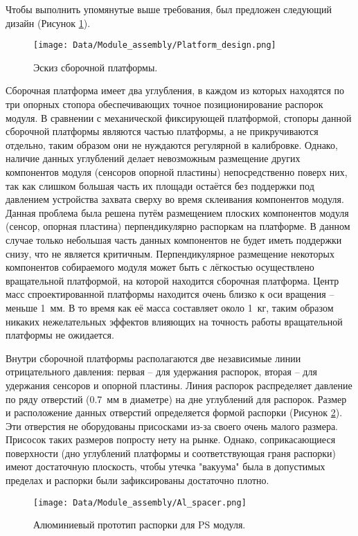 Чтобы выполнить упомянутые выше требования, был предложен следующий дизайн (Рисунок \ref{fig:platform_design}).

\begin{figure}[ht]\centering
\texttt{[image: Data/Module\_assembly/Platform\_design.png]}
\caption{Эскиз сборочной платформы.}
\label{fig:platform_design}
\end{figure}

Сборочная платформа имеет два углубления, в каждом из которых находятся по три опорных стопора обеспечивающих точное позиционирование распорок модуля. В сравнении с механической фиксирующей платформой, стопоры данной сборочной платформы являются частью платформы, а не прикручиваются отдельно, таким образом они не нуждаются регулярной в калибровке. Однако, наличие данных углублений делает невозможным размещение других компонентов модуля (сенсоров опорной пластины) непосредственно поверх них, так как слишком большая часть их площади остаётся без поддержки под давлением устройства захвата сверху во время склеивания компонентов модуля. Данная проблема была решена путём размещением плоских компонентов модуля (сенсор, опорная пластина) перпендикулярно распоркам на платформе. В данном случае только небольшая часть данных компонентов не будет иметь поддержки снизу, что не является критичным. Перпендикулярное размещение некоторых компонентов собираемого модуля может быть с лёгкостью осуществлено вращательной платформой, на которой находится сборочная платформа. Центр масс спроектированной платформы находится очень близко к оси вращения -- меньше 1~мм. В то время как её масса составляет около 1~кг, таким образом никаких нежелательных эффектов влияющих на точность работы вращательной платформы не ожидается.

Внутри сборочной платформы располагаются две независимые линии отрицательного давления: первая -- для удержания распорок, вторая -- для удержания сенсоров и опорной пластины. Линия распорок распределяет давление по ряду отверстий (0.7~мм в диаметре) на дне углублений для распорок. Размер и расположение данных отверстий определяется формой распорки (Рисунок \ref{fig:al_spacer}). Эти отверстия не оборудованы присосками из-за своего очень малого размера. Присосок таких размеров попросту нету на рынке. Однако, соприкасающиеся поверхности (дно углублений платформы и соответствующая граня распорки) имеют достаточную плоскость, чтобы утечка "вакуума" была в допустимых пределах и распорки были зафиксированы достаточно плотно.

\begin{figure}[ht]\centering
\texttt{[image: Data/Module\_assembly/Al\_spacer.png]}
\caption{Алюминиевый прототип распорки для PS модуля.}
\label{fig:al_spacer}
\end{figure}

